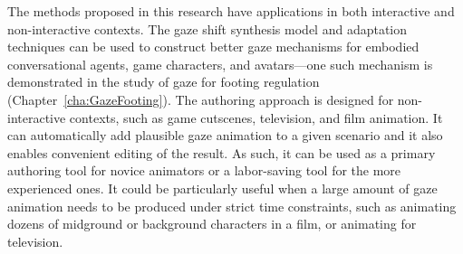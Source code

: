 The methods proposed in this research have applications in both interactive and non-interactive contexts. The gaze shift synthesis model and adaptation techniques can be used to construct better gaze mechanisms for embodied conversational agents, game characters, and avatars---one such mechanism is demonstrated in the study of gaze for footing regulation (Chapter~\ref{cha:GazeFooting}). The authoring approach is designed for non-interactive contexts, such as game cutscenes, television, and film animation. It can automatically add plausible gaze animation to a given scenario and it also enables convenient editing of the result. As such, it can be used as a primary authoring tool for novice animators or a labor-saving tool for the more experienced ones. It could be particularly useful when a large amount of gaze animation needs to be produced under strict time constraints, such as animating dozens of midground or background characters in a film, or animating for television.
